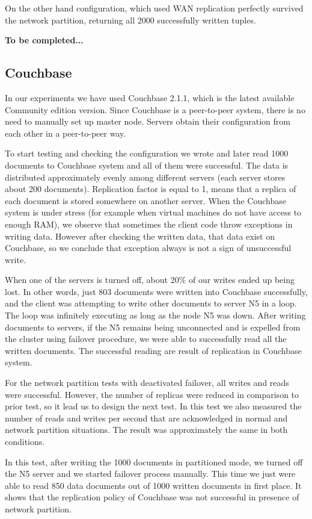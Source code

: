 \documentclass[a4paper]{article}
\begin{document}
On the other hand configuration, which used WAN replication perfectly survived the network partition, returning all 2000 successfully written tuples.

{\bf To be completed...}

\subsection{Couchbase}

In our experiments we have used Couchbase 2.1.1, which is the latest available Community edition version. 
Since Couchbase is a peer-to-peer system, there is no need to manually set up master node. 
Servers obtain their configuration from each other in a peer-to-peer way.

To start testing and checking the configuration we wrote and later read 1000 documents to Couchbase system and all of them were successful. 
The data is distributed approximately evenly among different servers (each server stores about 200 documents).
Replication factor is equal to 1, means that a replica of each document is stored somewhere on another server.
When the Couchbase system is under stress (for example when virtual machines do not have access to enough RAM), we observe that sometimes the client code throw exceptions in writing data.
However after checking the written data, that data exist on Couchbase, so we conclude that exception always is not a sign of unsuccessful write.  

When one of the servers is turned off, about 20\% of our writes ended up being lost.
In other words, just 803 documents were written into Couchbase successfully, and the client was attempting to write other documents to server N5 in a loop.
The loop was infinitely executing as long as the node N5 was down.
After writing documents to servers, if the N5 remains being unconnected and is expelled from the cluster using failover procedure, we were able to successfully read all the written documents.
The successful reading are result of replication in Couchbase system.

For the network partition tests with deactivated failover, all writes and reads were successful.  
However, the number of replicas were reduced in comparison to prior test, so it lead us to design the next test. 
In this test we also measured the number of reads and writes per second that are acknowledged in normal and network partition situations.
The result was approximately the same in both conditions.

In this test, after writing the 1000 documents in partitioned mode, we turned off the N5 server and we started failover process manually.
This time we just were able to read 850 data documents out of 1000 written documents in first place. 
It shows that the replication policy of Couchbase was not successful in presence of network partition.
\end{document}
